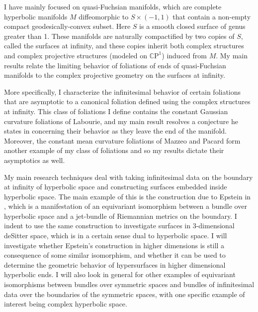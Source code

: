 \documentclass[11pt]{amsart}
\newcommand{\CP}{\mathbb{C}\mathrm{P}}
\begin{document}
I have mainly focused on quasi-Fuchsian manifolds, which are complete hyperbolic manifolds $M$ diffeomorphic to $S \times (-1,1)$ that contain a non-empty compact geodesically-convex subset. 
Here $S$ is a smooth closed surface of genus greater than 1. 
These manifolds are naturally compactified by two copies of $S$, called the surfaces at infinity, and these copies inherit both complex structures and complex projective structures (modeled on $\CP^1$) induced from $M$.
My main results relate the limiting behavior of foliations of ends of quasi-Fuchsian manifolds to the complex projective geometry on the surfaces at infinity.

More specifically, I characterize the infinitesimal behavior of certain foliations that are asymptotic to a canonical foliation defined using the complex structures at infinity. 
This class of foliations I define contains the constant Gaussian curvature foliations of Labourie, and my main result resolves a conjecture he states in \cite{labourie1992} concerning their behavior as they leave the end of the manifold. 
Moreover, the constant mean curvature foliations of Mazzeo and Pacard \cite{mazzeo-pacard2011} form another example of my class of foliations and so my results dictate their asymptotics as well.

My main research techniques deal with taking infinitesimal data on the boundary at infinity of hyperbolic space and constructing surfaces embedded inside hyperbolic space. 
The main example of this is the construction due to Epstein in \cite{epstein1984}, which is a manifestation of an equivariant isomorphism between a bundle over hyperbolic space and a jet-bundle of Riemannian metrics on the boundary. 
I indent to use the same construction to investigate surfaces in 3-dimensional deSitter space, which is in a certain sense dual to hyperbolic space. 
I will investigate whether Epstein's construction in higher dimensions is still a consequence of some similar isomorphism, and whether it can be used to determine the geometric behavior of hypersurfaces in higher dimensional hyperbolic ends.
I will also look in general for other examples of equivariant isomorphisms between bundles over symmetric spaces and bundles of infinitesimal data over the boundaries of the symmetric spaces, with one specific example of interest being complex hyperbolic space.
\end{document}
